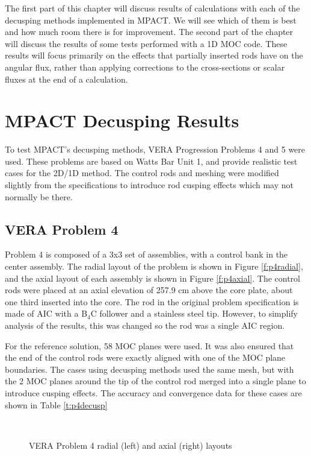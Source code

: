 The first part of this chapter will discuss results of calculations with each of the decusping methods implemented in MPACT.  We will see which of them is best and how much room there is for improvement.  The second part of the chapter will discuss the results of some tests performed with a 1D MOC code.  These results will focus primarily on the effects that partially inserted rods have on the angular flux, rather than applying corrections to the cross-sections or scalar fluxes at the end of a calculation.

\section{MPACT Decusping Results}

To test MPACT's decusping methods, VERA Progression Problems 4 and 5 \cite{VERAProgressionProblems} were used.  These problems are based on Watts Bar Unit 1, and provide realistic test cases for the 2D/1D method.  The control rods and meshing were modified slightly from the specifications to introduce rod cusping effects which may not normally be there.

\subsection{VERA Problem 4}

Problem 4 is composed of a 3x3 set of assemblies, with a control bank in the center assembly.  The radial layout of the problem is shown in Figure \ref{f:p4radial}, and the axial layout of each assembly is shown in Figure \ref{f:p4axial}.  The control rods were placed at an axial elevation of 257.9 cm above the core plate, about one third inserted into the core.  The rod in the original problem specification is made of AIC with a B$_4$C follower and a stainless steel tip.  However, to simplify analysis of the results, this was changed so the rod was a single AIC region.

For the reference solution, 58 MOC planes were used.  It was also ensured that the end of the control rods were exactly aligned with one of the MOC plane boundaries.  The cases using decusping methods used the same mesh, but with the 2 MOC planes around the tip of the control rod merged into a single plane to introduce cusping effects.  The accuracy and convergence data for these cases are shown in Table \ref{t:p4decusp}

\begin{figure}[h]\label{f:p4layout}
\centering
{}
~
\caption{VERA Problem 4 radial (left) and axial (right) layouts}\label{f:p4}
\end{figure}

